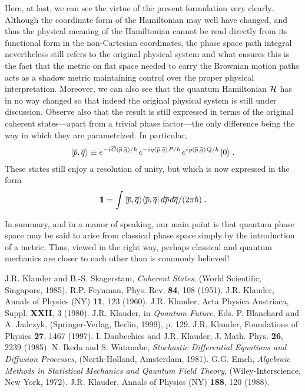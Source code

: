 \documentclass[12pt]{article}
\def\one{1\hskip-.37em 1}
\def\H{{\cal H}}
\def\s{\hskip.08em}
\def\o{\overline}
\def\bn{\begin{eqnarray}}     %
\def\en{\end{eqnarray}}       %
\def\<{\langle}
\def\>{\rangle}
\begin{document}
Here, at last, we can see the virtue of the present formulation very 
clearly. Although the coordinate form of the Hamiltonian may well have 
changed, and thus the physical meaning of the Hamiltonian cannot be read 
directly from its functional form in the non-Cartesian coordinates, the 
phase space path integral nevertheless still refers to the original 
physical system and what ensures this is the fact that the metric on 
flat space needed to carry the Brownian motion paths acts as a shadow 
metric maintaining control over the proper physical interpretation. 
Moreover, we can also see that the quantum Hamiltonian $\H$ has in no 
way changed so that indeed the original physical system is still under 
discussion. Observe also that the result is still expressed in terms of 
the original coherent states---apart from a trivial phase factor---the 
only difference being the way in which they are parametrized. In particular,
  \bn |{\o p},{\o q}\>\equiv e^{-i\s {\o G}({\o p},{\o q})/\hbar}\,
e^{-i\s q({\o p},{\o q})\s P/\hbar}\,e^{i\s p({\o p},{\o q})\s 
Q/\hbar}\,|0\>\;. \en 
These states still enjoy a resolution of unity, but which is now 
expressed in the form
  \bn  \one=\int |{\o p},{\o q}\>\<{\o p},{\o q}|\,d{\o p}\s 
d{\o q}/(2\pi\hbar)\;. \en

In summary, and in a manor of speaking, our main point is that quantum 
phase space may be said to arise from classical phase space simply by 
the introduction of a metric. Thus, viewed in the right way, perhaps 
classical and quantum mechanics are closer to each other than is 
commonly believed!


\begin{thebibliography}{99}
 J.R. Klauder and B.-S. Skagerstam, {\it Coherent States}, 
(World Scientific, Singapore, 1985).
R.P. Feynman, Phys. Rev. {\bf 84}, 108 (1951).
J.R. Klauder, Annals of Physics (NY) {\bf 11}, 123 (1960).
J.R. Klauder, Acta Physica Austriaca, Suppl. {\bf XXII}, 3 
(1980). 
J.R. Klauder, in {\it Quantum Future}, Eds. P. Blanchard and 
A. Jadczyk, (Springer-Verlag, Berlin, 1999), p. 129. 
J.R. Klauder, Foundations of Physics {\bf 27}, 1467 (1997).
I. Daubechies and J.R. Klauder, J. Math. Phys. {\bf 26}, 2239 
(1985). 
N. Ikeda and S. Watanabe, {\it Stochastic Differential 
Equations and Diffusion Processes}, (North-Holland, Amsterdam, 1981).
G.G. Emch, {\it Algebraic Methods in Statistical Mechanics 
and Qauntum Field Theory}, (Wiley-Interscience, New York, 1972).
J.R. Klauder, Annals of Physics (NY) {\bf 188}, 120 (1988).

\end{thebibliography}
\end{document}
